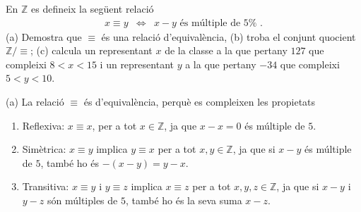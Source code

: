 \begin{exer}
En $\mathbb{Z}$ es defineix la seg\"{u}ent relaci\'{o}%
\begin{equation*}
\begin{array}{ccc}
x\equiv y & \Longleftrightarrow & x-y\text{ \ \'{e}s m\'{u}ltiple de }5\text{%
.}%
\end{array}%
\end{equation*}%
(a) Demostra que $\equiv $ \'{e}s una relaci\'{o} d'equival\`{e}ncia, (b)
troba el conjunt quocient $\mathbb{Z}/\equiv $; (c) calcula un representant $%
x$ de la classe a la que pertany $127$ que compleixi $8<x<15$ i un
representant $y$ a la que pertany $-34$ que compleixi $5<y<10$.
\end{exer}

\begin{solucio}
(a) La relaci\'{o} $\equiv $ \'{e}s d'equival\`{e}ncia, perqu\`{e} es
compleixen les propietats

\begin{enumerate}
\item Reflexiva: $x\equiv x$, per a tot $x\in \mathbb{Z}$, ja que $x-x=0$
\'{e}s m\'{u}ltiple de $5$.

\item Sim\`{e}trica: $x\equiv y$ implica $y\equiv x$ per a tot $x,y\in
\mathbb{Z}$, ja que si $x-y$ \'{e}s m\'{u}ltiple de $5$, tamb\'{e} ho \'{e}s
$-(x-y)=y-x$.

\item Transitiva: $x\equiv y$ i $y\equiv z$ implica $x\equiv z$ per a tot $%
x,y,z\in \mathbb{Z}$, ja que si $x-y$ i $y-z$ s\'{o}n m\'{u}ltiples de $5$,
tamb\'{e} ho \'{e}s la seva suma $x-z$.
\end{enumerate}


\end{solucio}
